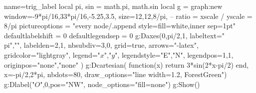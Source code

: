 \documentclass{standalone}%
\begin{document}
\begin{luadraw}{name=trig_label}
local pi, sin = math.pi, math.sin
local g = graph:new{ window={-9*pi/16,33*pi/16,-5.25,3.5}, 
    size={12,12,8/pi}, -- ratio = xscale / yscale = 8/pi
    pictureoptions = "every node/.append style={fill=white,inner sep=1pt}"
    }
defaultlabelshift = 0
defaultlegendsep = 0
g:Daxes({0,pi/2,1}, {labeltext={"\\pi",""}, labelden={2,1}, nbsubdiv={3,0}, 
    grid=true, arrows="-latex", gridcolor="lightgray", legend={"$x$","$y$"}, 
    legendstyle={"E","N"}, legendpos={1,1},  originpos={"none","none"} })
g:Dcartesian( function(x) return 3*sin(2*x-pi/2) end, 
    {x={-pi/2,2*pi}, nbdots=80, draw_options="line width=1.2, ForestGreen"})
g:Dlabel("$O$",0,{pos="NW", node_options="fill=none"})
g:Show()
\end{luadraw}
\end{document}
